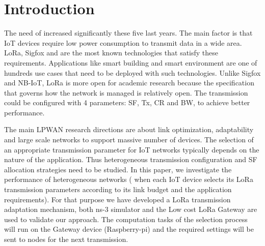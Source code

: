 \section{Introduction} \label{sec:Introduction}

The need of  increased significantly these five last years.
The main factor is that IoT devices require low power consumption to transmit data in a wide area.
LoRa,
	Sigfox and  are the most known technologies that satisfy these requirements.
Applications like smart building and smart environment are one of hundreds use cases that need to be deployed with such technologies.
Unlike Sigfox and NB-IoT,
	LoRa is more open for academic research because the specification that governs how the network is managed is relatively open.
The transmission could be configured with 4 parameters:
	\ac{SF},
	\ac{Tx},
	\ac{CR} and \ac{BW},
	to achieve better performance.

The main LPWAN research directions are about link optimization,
	adaptability and large scale networks to support massive number of devices.
The selection of an appropriate transmission parameter for IoT networks typically depends on the nature of the application.
Thus heterogeneous transmission configuration and \ac{SF} allocation strategies need to be studied.
In this paper,
	we investigate the performance of heterogeneous networks (\ie\red{,}
when each IoT device selects its LoRa transmission parameters according to its link budget and the application requirements).
For that purpose\red{,} we have developed a LoRa transmission adaptation mechanism,
	both ns-3 simulator and the Low cost LoRa Gateway \cite{lowcostloragateway} are used to validate our approach.
The computation tasks of the selection process will run on the Gateway device (Raspberry-pi) and the required settings will be sent to nodes for the next transmission.

